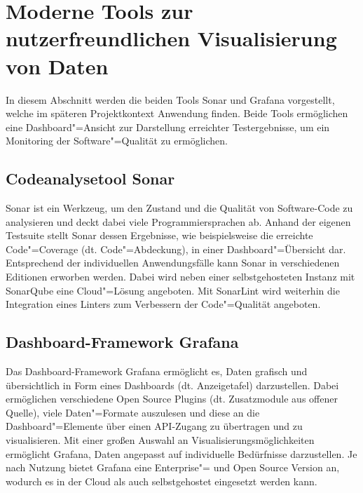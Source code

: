 \section{Moderne Tools zur nutzerfreundlichen Visualisierung von Daten}
\label{ch:SdF:Tools}

In diesem Abschnitt werden die beiden Tools Sonar und Grafana vorgestellt, welche im späteren Projektkontext Anwendung finden. Beide Tools ermöglichen eine Dash\-board"=Ansicht zur Darstellung erreichter Testergebnisse, um ein Monitoring der Software"=Qualität zu ermöglichen.

\subsection{Codeanalysetool Sonar}
\label{ch:SdF:Tools:sec:Sonar}

Sonar ist ein Werkzeug, um den Zustand und die Qualität von Soft\-ware-Code zu analysieren und deckt dabei viele Programmiersprachen ab. Anhand der eigenen Testsuite stellt Sonar dessen Ergebnisse, wie beispielsweise die erreichte Code"=Coverage (dt. Code"=Abdeckung), in einer Dashboard"=Übersicht dar. Entsprechend der individuellen Anwendungsfälle kann Sonar in verschiedenen Editionen erworben werden. Dabei wird neben einer selbstgehosteten Instanz mit SonarQube eine Cloud"=Lösung angeboten. Mit SonarLint wird weiterhin die Integration eines Linters zum Verbessern der Code"=Qualität angeboten. \cite{Sonar:SonarLint, Sonar:Plans_and_Pricing, Sonar:SonarQube}

\subsection{Dashboard-Framework Grafana}
\label{ch:SdF:Tool:sec:Grafana}

Das Dashboard-Framework Grafana ermöglicht es, Daten grafisch und übersichtlich in Form eines Dash\-boards (dt. Anzeigetafel) darzustellen. Dabei ermöglichen verschiedene Open Source Plugins (dt. Zusatzmodule aus offener Quelle), viele Daten"=Formate auszulesen und diese an die Dash\-board"=Elemente über einen API-Zugang zu übertragen und zu visualisieren. Mit einer großen Auswahl an Visualisierungsmöglichkeiten ermöglicht Grafana, Daten angepasst auf individuelle Bedürfnisse darzustellen. Je nach Nutzung bietet Grafana eine Enterprise"= und Open Source Version an, wodurch es in der Cloud als auch selbstgehostet eingesetzt werden kann. \cite{Grafana:Build_Dashboards, Grafana:Dashboards, MichelleTan:2023}
